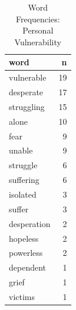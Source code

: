 \begin{table}[ht]
\centering
\begin{tabular}{lr}
  \hline
word & n \\ 
  \hline
vulnerable &  19 \\ 
  desperate &  17 \\ 
  struggling &  15 \\ 
  alone &  10 \\ 
  fear &   9 \\ 
  unable &   9 \\ 
  struggle &   6 \\ 
  suffering &   6 \\ 
  isolated &   3 \\ 
  suffer &   3 \\ 
  desperation &   2 \\ 
  hopeless &   2 \\ 
  powerless &   2 \\ 
  dependent &   1 \\ 
  grief &   1 \\ 
  victims &   1 \\ 
   \hline
\end{tabular}
\caption{Word Frequencies: Personal Vulnerability} 
\end{table}
